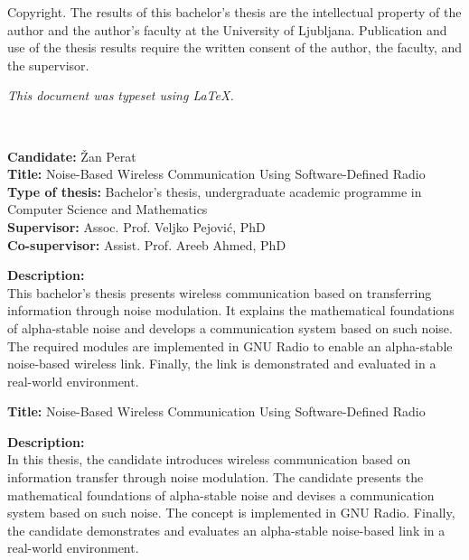 \documentclass[a4paper, 12pt, openany]{book}
\newcommand{\clearemptydoublepage}{\newpage{\pagestyle{empty}\cleardoublepage}}
\begin{document}
\thispagestyle{empty}
\vspace*{8cm}

\noindent
{\sc Copyright}. 
The results of this bachelor's thesis are the intellectual property of the author and the author's faculty at the University of Ljubljana.
Publication and use of the thesis results require the written consent of the author, the faculty, and the supervisor.

\begin{center}
\mbox{}\vfill
\emph{This document was typeset using \LaTeX.}
\end{center}
\clearemptydoublepage

\thispagestyle{empty}
\
\vfill

\bigskip
\noindent\textbf{Candidate:} Žan Perat\\
\noindent\textbf{Title:} Noise-Based Wireless Communication Using Software-Defined Radio\\
\noindent\textbf{Type of thesis:} Bachelor's thesis, undergraduate academic programme in Computer Science and Mathematics\\
\noindent\textbf{Supervisor:} Assoc. Prof. Veljko Pejović, PhD\\
\noindent\textbf{Co-supervisor:} Assist. Prof. Areeb Ahmed, PhD

\bigskip
\noindent\textbf{Description:}\\
This bachelor's thesis presents wireless communication based on transferring information through noise modulation. It explains the mathematical foundations of alpha-stable noise and develops a communication system based on such noise. The required modules are implemented in GNU Radio to enable an alpha-stable noise-based wireless link. Finally, the link is demonstrated and evaluated in a real-world environment.

\bigskip
\noindent\textbf{Title:} Noise-Based Wireless Communication Using Software-Defined Radio

\bigskip
\noindent\textbf{Description:}\\
In this thesis, the candidate introduces wireless communication based on information transfer through noise modulation. The candidate presents the mathematical foundations of alpha-stable noise and devises a communication system based on such noise. The concept is implemented in GNU Radio. Finally, the candidate demonstrates and evaluates an alpha-stable noise-based link in a real-world environment.
\end{document}
